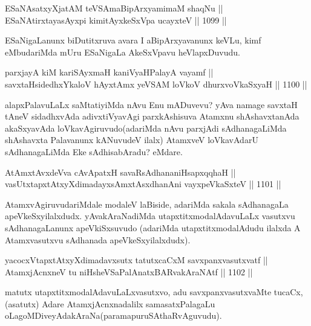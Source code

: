 \begin{shl}
ESaNAsatxyXjatAM teVSAmaBipArxyamimaM shaqNu ||  \\
ESaNAtirxtayasAyxpi kimitAyxkeSxVpa ucayxteV \hfill || 1099 ||  
\end{shl}

\begin{artha}
ESaNigaLanunx biDutitxruva avara I aBipArxyavanunx keVLu, kimf  eMbudariMda mUru ESaNigaLa AkeSxVpavu heVlapxDuvudu.
\end{artha}

\begin{shl}
parxjayA kiM kariSAyxmaH kaniVyaHPalayA vayamf || \\
savxtaHsidedhxYkaloV hAyxtAmx yeVSAM loVkoV dhurxvoV\s kaSxyaH \hfill || 1100 ||  
\end{shl}

\begin{artha}
alapxPalavuLaLx saMtatiyiMda nAvu Enu mADuvevu? yAva namage savxtaH tAneV sidadhxvAda adivxtiVyavAgi parxkAshisuva Atamxnu shAshavxtanAda akaSxyavAda loVkavAgiruvudo(adariMda nAvu parxjAdi sAdhanagaLiMda shAshavxta Palavanunx kANuvudeV ilalx) AtamxveV loVkavAdarU sAdhanagaLiMda Eke sAdhisabAradu? eMdare.
\end{artha}

\begin{shl}
AtAmxtAvxdeVva cAvApatxH savaRsAdhananiHsapxqqhaH || \\
vasUtxtapxtAtxyXdimadayxsAmxtAsxdhanAni vayxpeVkaSxteV \hfill || 1101 ||  
\end{shl}

\begin{artha}
AtamxvAgiruvudariMdale modaleV laBiside, adariMda sakala sAdhanagaLa apeVkeSxyilalxdudx. yAvakAraNadiMda utapxtitxmodalAdavuLaLx vasutxvu sAdhanagaLanunx apeVkiSxsuvudo (adariMda utapxtitxmodalAdudu ilalxda A Atamxvasutxvu sAdhanada apeVkeSxyilalxdudx).
\end{artha}

\begin{shl}
yacocxVtapxtAtxyXdimadavxsutx tatutxcaCxM savxpanxvasutxvatf || \\
AtamxjAcnxneV tu niHsheVSaPalAnatxBARvakAraNAtf \hfill || 1102 ||  
\end{shl}

\begin{artha}
matutx utapxtitxmodalAdavuLaLxvasutxvo, adu savxpanxvasutxvaMte tucaCx, (asatutx) Adare AtamxjAcnxnadalilx samasatxPalagaLu oLagoMDiveyAdakAraNa(paramapuruSAthaRvAguvudu).
\end{artha}

